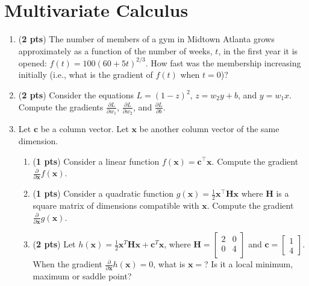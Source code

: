 \documentclass[11pt, letterpaper]{article}
\begin{document}
\section{Multivariate Calculus}
\begin{enumerate}[label=(\alph*)]
	\item (\textbf{2 pts}) The number of members of a gym in  Midtown Atlanta grows approximately as a function of the number of weeks, $t$, in the first year it is opened: $f(t) = 100 (60 + 5t)^{2/3}$. How fast was the membership increasing initially (i.e., what is the gradient of $f(t)$ when $t=0$)?
	
    \item (\textbf{2 pts}) Consider the equations $L = (1 - z)^2$, $z = w_2y + b$, and $y = w_1x$.\\Compute the gradients $\frac{\partial L}{\partial w_1}$, $\frac{\partial L}{\partial w_2}$, and $\frac{\partial L}{\partial b}$.


	\item Let $\mathbf{c}$ be a column vector. Let $\mathbf{x}$ be another column vector of the same dimension. 


    \begin{enumerate}[label=(\roman*)]
	   \item (\textbf{1 pts}) Consider a linear function $f(\mathbf{x})=\mathbf{c}^\top\mathbf{x}$. Compute the gradient $\frac{\partial}{\partial\mathbf{x}}f(\mathbf{x})$.
	   \item (\textbf{1 pts}) Consider a quadratic function $g(\mathbf{x})=\frac{1}{2}\mathbf{x}^\top\mathbf{H}\mathbf{x}$ where $\mathbf{H}$ is a square matrix of dimensions compatible with $\mathbf{x}$. Compute the gradient $\frac{\partial}{\partial\mathbf{x}}g(\mathbf{x})$.
	   \item (\textbf{2 pts}) Let
	   $h(\mathbf{x})=\frac{1}{2}\mathbf{x}^T\mathbf{H}\mathbf{x}+\mathbf{c}^T\mathbf{x}$, where $\mathbf{H} = \begin{bmatrix} 
                2 & 0\\
                0 & 4\\
           \end{bmatrix}$ and $\mathbf{c} = \begin{bmatrix} 1 \\ 4\end{bmatrix}$. When the gradient $\frac{\partial}{\partial\mathbf{x}}h(\mathbf{x}) = 0$, what is $\mathbf{x} =$? Is it a local minimum, maximum or saddle point? 
    \end{enumerate}
    
\end{enumerate}
\end{document}
